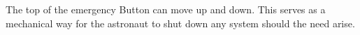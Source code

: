 The top of the emergency Button can move up and down. This serves as a mechanical way for the astronaut to shut down any system should the need arise.

